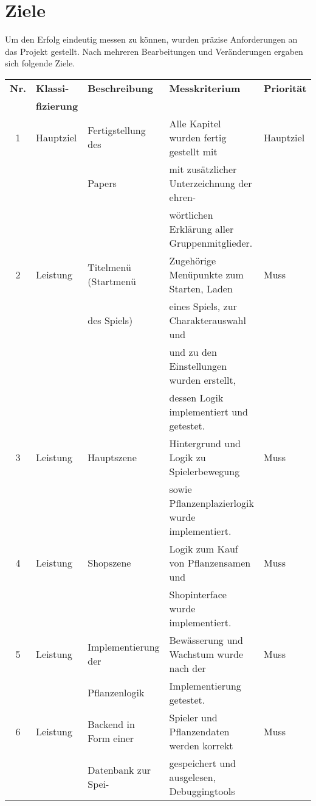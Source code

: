 \chapter{Ziele}\label{ch:ziele}
Um den Erfolg eindeutig messen zu können, wurden präzise Anforderungen an das Projekt gestellt.
Nach mehreren Bearbeitungen und Veränderungen ergaben sich folgende Ziele.
\vspace{0.5cm}
\begin{table}[H]\label{tab:psteckbrief}
    \centering
    \begin{tabular}{|c|l|l|l|l|}
        \hline
        \textbf{Nr.} & \textbf{Klassi-} & \textbf{Beschreibung} & \textbf{Messkriterium} & \textbf{Priorität}\\
        & \textbf{fizierung} &&&\\[0.5ex]
        \hline \hline
        1 & Hauptziel & Fertigstellung des & Alle Kapitel wurden fertig gestellt mit & Hauptziel\\
        && Papers & mit zusätzlicher Unterzeichnung der ehren- &\\
        &&& wörtlichen Erklärung aller Gruppenmitglieder.&\\
        \hline
        2 & Leistung & Titelmenü (Startmenü & Zugehörige Menüpunkte zum Starten, Laden & Muss\\
        && des Spiels) & eines Spiels, zur Charakterauswahl und & \\
        &&& und zu den Einstellungen wurden erstellt,&\\
        &&& dessen Logik implementiert und getestet. & \\
        \hline
        3 & Leistung & Hauptszene & Hintergrund und Logik zu Spielerbewegung & Muss\\
        &&& sowie Pflanzenplazierlogik wurde implementiert. & \\
        \hline
        4 & Leistung &Shopszene& Logik zum Kauf von Pflanzensamen und & Muss\\
        &&& Shopinterface wurde implementiert.&\\
        \hline
        5 & Leistung & Implementierung der & Bewässerung und Wachstum wurde nach der & Muss\\
        && Pflanzenlogik & Implementierung getestet. &\\
        \hline
        6 & Leistung & Backend in Form einer & Spieler und Pflanzendaten werden korrekt & Muss\\
        && Datenbank zur Spei- & gespeichert und ausgelesen, Debuggingtools &\\

\end{tabular}
\end{table}
